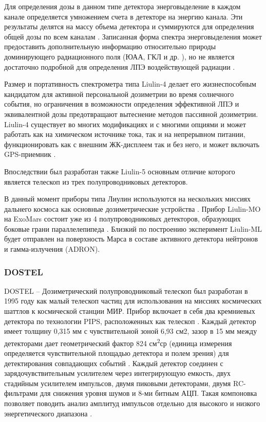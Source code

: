 Для определения дозы в данном типе детектора энерговыделение в каждом канале определяется умножением счета в детекторе на энергию канала. Эти результаты делятся на массу объема детектора и суммируются для определения общей дозы по всем каналам \cite{Dachev2002} \cite{Luszik-Bhadra2010}. Записанная форма спектра энерговыделения может предоставить дополнительную информацию относительно природы доминирующего радиационного поля (ЮАА, ГКЛ и др. ), но не является достаточно подробной для определения ЛПЭ воздействующей радиации \cite{Caffrey2011}. 



Размер и портативность спектрометра типа Liulin-4 делает его жизнеспособным кандидатом для активной персональной дозиметрии во время солнечного события, но ограничения в возможности определения эффективной ЛПЭ и эквивалентной дозы предотвращают вытеснение методов пассивной дозиметрии. Liulin-4 существует во многих модификациях и с многими опциями и может работать как на химическом источнике тока, так и на непрерывном питании, функционировать как с внешним ЖК-дисплеем так и без него, и может включать GPS-приемник \cite{Dachev2002}.	

Впоследствии был разработан также Liulin-5 основным отличие которого является телескоп из трех полупроводниковых детекторов.

В данный момент приборы типа Лиулин используются на нескольких миссиях дальнего космоса как основные дозиметрические устройства \cite{Dachev2015}. Прибор Liulin-MO на ExoMars состоит уже из 4 полупроводниковых детекторов, образующих  боковые грани параллелепипеда \cite{Semkova2015}. Близкий по построению эксперимент Liulin-ML будет отправлен на поверхность Марса в составе активного детектора нейтронов и гамма-излучения (ADRON).

\subsubsection{DOSTEL}

DOSTEL -- Дозиметрический полупроводниковый телескоп был разработан в 1995 году как малый телескоп частиц для использования на миссиях космических шаттлов к космической станции МИР. Прибор включает в себя два кремниевых детектора по технологии PIPS, расположенных как телескоп \cite{Beaujean2002}. Каждый детектор имеет толщину 0,315 мм с чувствительной зоной 6,93 см2, зазор в 15 мм между детекторами дает геометрический фактор 824 см\textsuperscript{2}ср (единица измерения определяется чувствительной площадью детектора и полем зрения) для детектирования совпадающих событий \cite{Beaujean2002}. Каждый детектор соединен с зарядочувствительным усилителем через интегрирующую емкость, двух стадийным усилителем импульсов, двумя пиковыми детекторами, двумя RC-фильтрами для снижения уровня шумов и 8-ми битным АЦП. Такая компоновка позволяет поводить анализ амплитуд импульсов отдельно для высокого и низкого энергетического диапазона \cite{Beaujean2002}.


